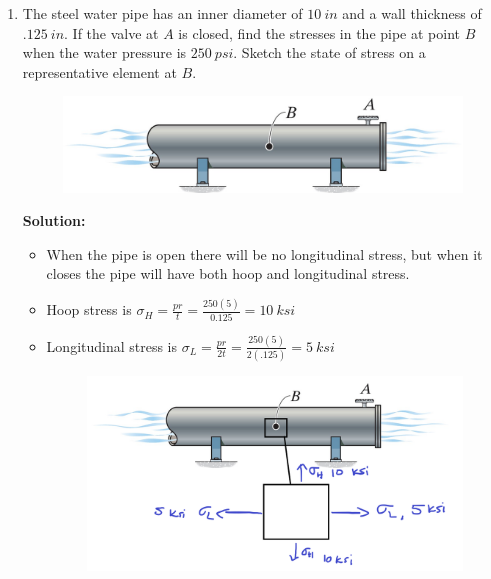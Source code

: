 \documentclass[12pt, oneside]{article}
\let\US\SI
\begin{document}
\begin{enumerate}
	\item %
		The steel water pipe has an inner diameter of $ 	\US{10}{in}  $ and a wall thickness of $ 	\US{.125}{in}  $.
		If the valve at $A$ is closed, find the stresses in the pipe at point $B$ when the water pressure is $ 	\US{250}{psi}  $.
		Sketch the state of stress on a representative element at $B$.
		\begin{figure}[H]
			\centering
			\includegraphics[width=0.6\linewidth]{8-9}
		\end{figure}
			\textbf{Solution:}
			\begin{itemize}
				\item When the pipe is open there will be no longitudinal stress, but when it closes the pipe will have both hoop and longitudinal stress.
				\item Hoop stress is $\sigma_H = \frac{p r}{t} = \frac{250(5)}{0.125} = 	\US{10}{ksi} $
				\item Longitudinal stress is $\sigma_L = \frac{p r}{2t} = \frac{250(5)}{2(.125)} = 	\US{5 }{ksi} $
					\begin{figure}[H]
						\centering
						\includegraphics[width=0.6\linewidth]{8-9-ans}
					\end{figure}
			\end{itemize}


\end{enumerate}
\end{document}
